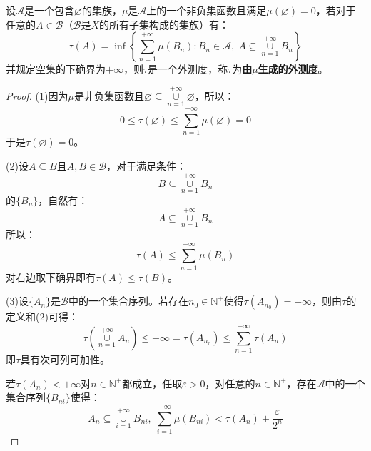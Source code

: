 \begin{theorem}
	设$\mathscr{A}$是一个包含$\varnothing$的集族，$\mu$是$\mathscr{A}$上的一个非负集函数且满足$\mu(\varnothing)=0$，若对于任意的$A\in\mathscr{B}$（$\mathscr{B}$是$X$的所有子集构成的集族）有：
	\begin{equation*}
		\tau(A)=\inf\left\{\sum_{n=1}^{+\infty}\mu(B_n):B_n\in\mathscr{A},\;A\subseteq\underset{n=1}{\overset{+\infty}{\cup}}B_n\right\}
	\end{equation*}
	并规定空集的下确界为$+\infty$，则$\tau$是一个外测度，称$\tau$为\textbf{由$\mu$生成的外测度}。
\end{theorem}
\begin{proof}
	(1)因为$\mu$是非负集函数且$\varnothing\subseteq\underset{n=1}{\overset{+\infty}{\cup}}\varnothing$，所以：
	\begin{equation*}
		0\leqslant\tau(\varnothing)\leqslant\sum_{n=1}^{+\infty}\mu(\varnothing)=0
	\end{equation*}
	于是$\tau(\varnothing)=0$。\par
	(2)设$A\subseteq B$且$A,B\in\mathscr{B}$，对于满足条件：
	\begin{equation*}
		B\subseteq\underset{n=1}{\overset{+\infty}{\cup}}B_n
	\end{equation*}
	的$\{B_n\}$，自然有：
	\begin{equation*}
		A\subseteq\underset{n=1}{\overset{+\infty}{\cup}}B_n
	\end{equation*}
	所以：
	\begin{equation*}
		\tau(A)\leqslant\sum_{n=1}^{+\infty}\mu(B_n)
	\end{equation*}
	对右边取下确界即有$\tau(A)\leqslant\tau(B)$。\par
	(3)设$\{A_n\}$是$\mathscr{B}$中的一个集合序列。若存在$n_0\in\mathbb{N}^+$使得$\tau(A_{n_0})=+\infty$，则由$\tau$的定义和(2)可得：
	\begin{equation*}
		\tau\left(\underset{n=1}{\overset{+\infty}{\cup}}A_n\right)\leqslant+\infty=\tau(A_{n_0})\leqslant\sum_{n=1}^{+\infty}\tau(A_n)
	\end{equation*}
	即$\tau$具有次可列可加性。\par
	若$\tau(A_n)<+\infty$对$n\in\mathbb{N}^+$都成立，任取$\varepsilon>0$，对任意的$n\in\mathbb{N}^+$，存在$\mathscr{A}$中的一个集合序列$\{B_{ni}\}$使得：
	\begin{equation*}
		A_n\subseteq\underset{i=1}{\overset{+\infty}{\cup}}B_{ni},\;
		\sum_{i=1}^{+\infty}\mu(B_{ni})<\tau(A_n)+\frac{\varepsilon}{2^n}
	\end{equation*}

\end{proof}
